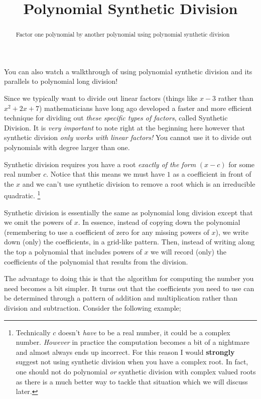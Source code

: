 \documentclass{ximera}
\title{Polynomial Synthetic Division}
\begin{document}
\begin{abstract}
    Factor one polynomial by another polynomial using polynomial synthetic division
\end{abstract}%
\maketitle


You can also watch a walkthrough of using polynomial synthetic division and its parallels to polynomial long division!


Since we typically want to divide out linear factors (things like $x-3$ rather than $x^2 + 2x + 7$) mathematicians have long ago developed a faster and more efficient technique for dividing out \textit{these specific types of factors}, called Synthetic Division. It is \textit{very important} to note right at the beginning here however that synthetic division \textit{only works with linear factors!} You cannot use it to divide out polynomials with degree larger than one.

Synthetic division requires you have a root \textit{exactly of the form }$(x-c)$ for some real number $c$. Notice that this means we must have $1$ as a coefficient in front of the $x$ and we can't use synthetic division to remove a root which is an irreducible quadratic.%
\footnote{%
    Technically $c$ doesn't \textit{have} to be a real number, it could be a complex number. \textit{However} in practice the computation becomes a bit of a nightmare and almost always ends up incorrect. For this reason I would \textbf{strongly} suggest not using synthetic division when you have a complex root. In fact, one should not do polynomial \textit{or} synthetic division with complex valued roots as there is a much better way to tackle that situation which we will discuss later.%
    }

Synthetic division is essentially the same as polynomial long division except that we omit the powers of $x$. In essence, instead of copying down the polynomial (remembering to use a coefficient of zero for any missing powers of $x$), we write down (only) the coefficients, in a grid-like pattern. Then, instead of writing along the top a polynomial that includes powers of $x$ we will record (only) the coefficients of the polynomial that results from the division.

The advantage to doing this is that the algorithm for computing the number you need becomes a bit simpler. It turns out that the coefficients you need to use can be determined through a pattern of addition and multiplication rather than division and subtraction. Consider the following example; 
\end{document}
